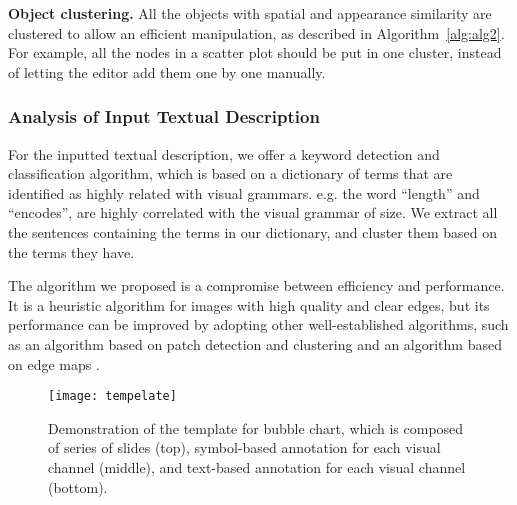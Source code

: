 \textbf{Object clustering.} All the objects with spatial and appearance similarity are clustered to allow an efficient manipulation, as described in Algorithm~\ref{alg:alg2}. For example, all the nodes in a scatter plot should be put in one cluster, instead of letting the editor add them one by one manually.     

\subsubsection{Analysis of Input Textual Description}
For the inputted textual description, we offer a keyword detection and classification algorithm, which is based on a dictionary of terms that are identified as highly related with visual grammars. e.g. the word ``length'' and ``encodes'', are highly correlated with the  visual grammar of size. We extract all the sentences containing the terms in our dictionary, and cluster them based on the terms they have.

The algorithm we proposed is a compromise between efficiency and performance. It is a heuristic algorithm for images with high quality and clear edges, but its performance can be improved by adopting other well-established algorithms, such as an algorithm based on patch detection and clustering \cite{savva_revision:_2011} and an algorithm based on edge maps \cite{huang2003model}.

\begin{figure}
 \centering 
 \texttt{[image: tempelate]}
 \caption{Demonstration of the template for bubble chart, which is composed of series of slides (top), symbol-based annotation for each visual channel (middle), and text-based annotation for each visual channel (bottom). }
 \label{fig:template}
\end{figure}


